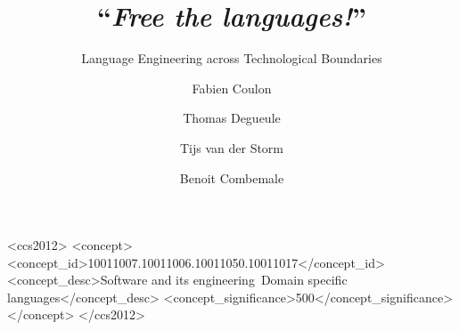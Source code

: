 \documentclass[sigplan, screen]{acmart}
\begin{document}
\title{``\emph{Free the languages!}''}
\subtitle{Language Engineering across Technological Boundaries}

\author{Fabien Coulon}

\author{Thomas Degueule}

\author{Tijs van der Storm}

\author{Benoit Combemale}




%
%
 \begin{CCSXML}
	<ccs2012>
	<concept>
	<concept_id>10011007.10011006.10011050.10011017</concept_id>
	<concept_desc>Software and its engineering~Domain specific languages</concept_desc>
	<concept_significance>500</concept_significance>
	</concept>
	</ccs2012>
\end{CCSXML}




\maketitle






\clearpage
\balance


\end{document}
